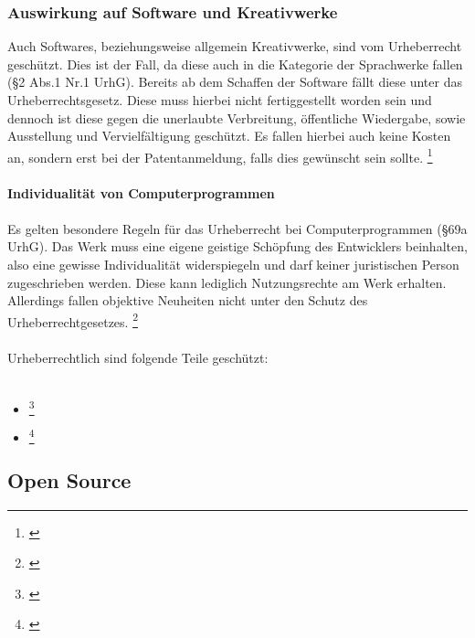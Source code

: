 \documentclass[titlepage,12pt,twoside]{article}
\begin{document}
\subsubsection{Auswirkung auf Software und Kreativwerke}
Auch Softwares, beziehungsweise allgemein Kreativwerke, sind vom Urheberrecht geschützt. Dies ist der Fall, 
da diese auch in die Kategorie der Sprachwerke fallen (§2 Abs.1 Nr.1 UrhG). Bereits ab dem Schaffen der 
Software fällt diese unter das Urheberrechtsgesetz. Diese muss hierbei nicht fertiggestellt worden sein und 
dennoch ist diese gegen die unerlaubte Verbreitung, öffentliche Wiedergabe, sowie Ausstellung und 
Vervielfältigung geschützt. Es fallen hierbei auch keine Kosten an, sondern erst bei der Patentanmeldung, 
falls dies gewünscht sein sollte. \footnote{\cite{Ionos7}} \\
\\
\textbf{Individualität von Computerprogrammen} \\
\\
Es gelten besondere Regeln für das Urheberrecht bei Computerprogrammen (§69a UrhG). Das Werk muss eine eigene 
geistige Schöpfung des Entwicklers beinhalten, also eine gewisse Individualität widerspiegeln und darf keiner 
juristischen Person zugeschrieben werden. Diese kann lediglich Nutzungsrechte am Werk erhalten. Allerdings 
fallen objektive Neuheiten nicht unter den Schutz des Urheberrechtgesetzes. \footnote{\cite{Ionos8}} \\
\\
Urheberrechtlich sind folgende Teile geschützt: \\
\\
\begin{itemize}
	\item {} \footnote{\cite{Ionos9}}
	\item {} \footnote{\cite{Ionos10}}
\end{itemize}
\hfill \break

\subsection{Open Source}
\end{document}
